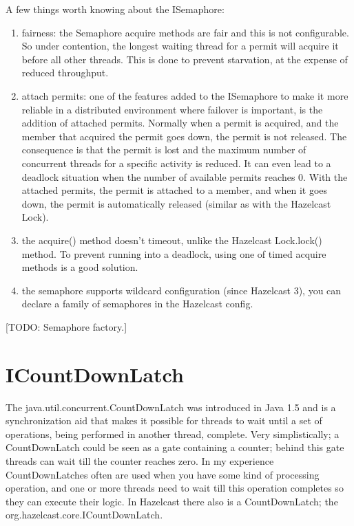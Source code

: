 A few things worth knowing about the ISemaphore:
\begin{enumerate}
\item fairness: the Semaphore acquire methods are fair and this is not configurable. So under contention, the longest waiting thread for a permit will acquire it before all other threads. This is done to prevent starvation, at the expense of reduced throughput.
\item attach permits: one of the features added to the ISemaphore to make it more reliable in a distributed environment where failover is important, is the addition of attached permits. Normally when a permit is acquired, and the member that acquired the permit goes down, the permit is not released. The consequence is that the permit is lost and the maximum number of concurrent threads for a specific activity is reduced. It can even lead to a deadlock situation when the number of available permits reaches 0. With the attached permits, the permit is attached to a member, and when it goes down, the permit is automatically released (similar as with the Hazelcast Lock).
\item the acquire() method doesn't timeout, unlike the Hazelcast Lock.lock() method. To prevent running into a deadlock, using one of timed acquire methods is a good solution.
\item the semaphore supports wildcard configuration (since Hazelcast 3), you can declare a family of semaphores in the Hazelcast config. 
\end{enumerate}

[TODO: Semaphore factory.]

\section{ICountDownLatch}
The java.util.concurrent.CountDownLatch was introduced in Java 1.5 and is a synchronization aid that makes it possible for threads to wait until a set of operations, being performed in another thread, complete. Very simplistically; a CountDownLatch could be seen as a gate containing a counter; behind this gate threads can wait till the counter reaches zero. In my experience CountDownLatches often are used when you have some kind of processing operation, and one or more threads need to wait till this operation completes so they can execute their logic. In Hazelcast there also is a CountDownLatch; the org.hazelcast.core.ICountDownLatch.

